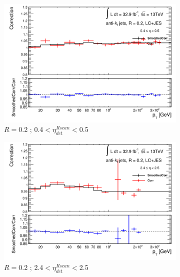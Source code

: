 \begin{figure}[ht]
    \centering
    \begin{subfigure}[b]{0.495\textwidth}
        \centering
        \includegraphics[width=\textwidth]{images/Smo_2LC_pt_Sherpa_49.png}
        \caption{$R=$0.2 ; 0.4$<\eta^{Rscan}_{det}<$0.5}
    \end{subfigure}
    \hfill
    \begin{subfigure}[b]{0.495\textwidth}
        \centering
        \includegraphics[width=\textwidth]{images/Smo_2LC_pt_Sherpa_69.png}
        \caption{$R=$0.2 ; 2.4$<\eta^{Rscan}_{det}<$2.5}
        \label{fig:fitMaloSherpa}
    \end{subfigure}
    \vfill
    \begin{subfigure}[b]{0.495\textwidth}
        \centering

\end{subfigure}
\end{figure}
